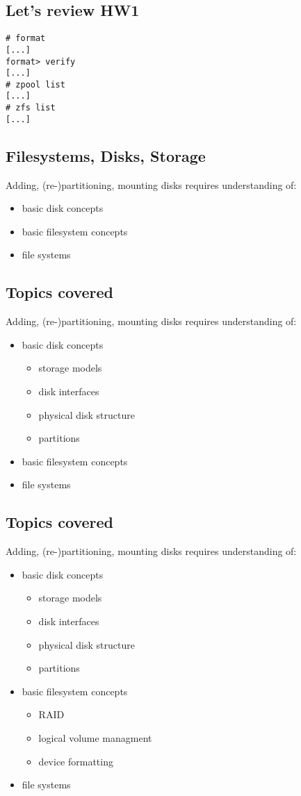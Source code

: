 \documentclass[xga]{xdvislides}
\begin{document}
\subsection{Let's review HW1}
\begin{verbatim}
# format
[...]
format> verify
[...]
# zpool list
[...]
# zfs list
[...]
\end{verbatim}



\subsection{Filesystems, Disks, Storage}
Adding, (re-)partitioning, mounting disks requires understanding of:
\begin{itemize}
	\item basic disk concepts
	\item basic filesystem concepts
	\item file systems
\end{itemize}

\subsection{Topics covered}
Adding, (re-)partitioning, mounting disks requires understanding of:
\begin{itemize}
	\item basic disk concepts
		\begin{itemize}
			\item storage models
			\item disk interfaces
			\item physical disk structure
			\item partitions
		\end{itemize}
	\item basic filesystem concepts
	\item file systems
\end{itemize}

\subsection{Topics covered}
Adding, (re-)partitioning, mounting disks requires understanding of:
\begin{itemize}
	\item basic disk concepts
		\begin{itemize}
			\item storage models
			\item disk interfaces
			\item physical disk structure
			\item partitions
		\end{itemize}
	\item basic filesystem concepts
		\begin{itemize}
			\item RAID
			\item logical volume managment
			\item device formatting
		\end{itemize}
	\item file systems
\end{itemize}
\end{document}

